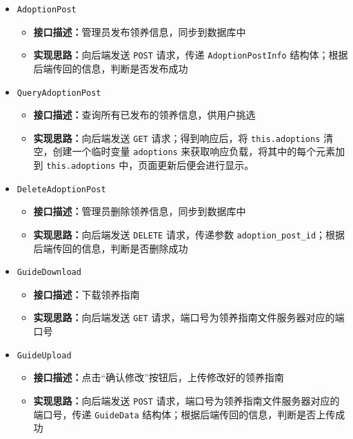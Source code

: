\documentclass[12pt,a4paper,UTF8]{article}
\begin{document}
\begin{itemize}
  \item \verb|AdoptionPost|
  \begin{itemize}
  \item \textbf{接口描述：}管理员发布领养信息，同步到数据库中
  \item \textbf{实现思路：}向后端发送 \verb|POST| 请求，传递 \verb|AdoptionPostInfo| 结构体；根据后端传回的信息，判断是否发布成功
  \end{itemize}

  \item \verb|QueryAdoptionPost|
  \begin{itemize}
  \item \textbf{接口描述：}查询所有已发布的领养信息，供用户挑选
  \item \textbf{实现思路：}向后端发送 \verb|GET| 请求；得到响应后，将 \verb|this.adoptions| 清空，创建一个临时变量 \verb|adoptions| 来获取响应负载，将其中的每个元素加到 \verb|this.adoptions| 中，页面更新后便会进行显示。
  \end{itemize}

  \item \verb|DeleteAdoptionPost|
  \begin{itemize}
  \item \textbf{接口描述：}管理员删除领养信息，同步到数据库中
  \item \textbf{实现思路：}向后端发送 \verb|DELETE| 请求，传递参数 \verb|adoption_post_id|；根据后端传回的信息，判断是否删除成功
  \end{itemize}

  \item \verb|GuideDownload|
  \begin{itemize}
  \item \textbf{接口描述：}下载领养指南
  \item \textbf{实现思路：}向后端发送 \verb|GET| 请求，端口号为领养指南文件服务器对应的端口号
  \end{itemize}

  \item \verb|GuideUpload|
  \begin{itemize}
  \item \textbf{接口描述：}点击“确认修改”按钮后，上传修改好的领养指南
  \item \textbf{实现思路：}向后端发送 \verb|POST| 请求，端口号为领养指南文件服务器对应的端口号，传递 \verb|GuideData| 结构体；根据后端传回的信息，判断是否上传成功
  \end{itemize}

\end{itemize}
\end{document}
